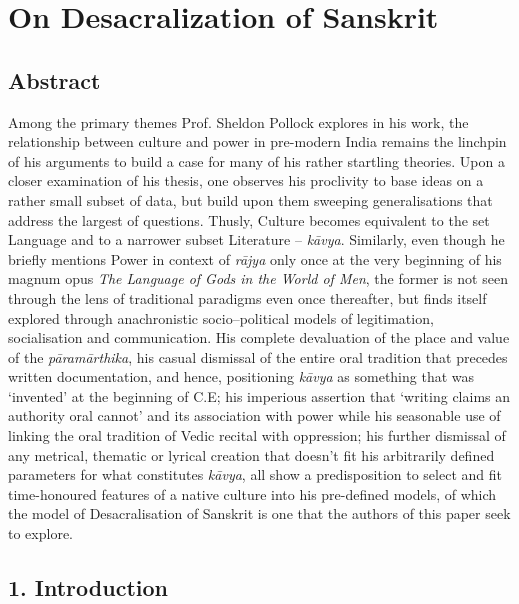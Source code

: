 
\chapter{On Desacralization of Sanskrit}\label{chapter8}



\section*{Abstract}

Among the primary themes Prof. Sheldon Pollock explores in his work, the relationship between culture and power in pre-modern India remains the linchpin of his arguments to build a case for many of his rather startling theories. Upon a closer examination of his thesis, one observes his proclivity to base ideas on a rather small subset of data, but build upon them sweeping generalisations that address the largest of questions. Thusly, Culture becomes equivalent to the set Language and to a narrower subset Literature – \textit{kāvya}. Similarly, even though he briefly mentions Power in context of \textit{rājya} only once at the very beginning of his magnum opus \textit{The Language of Gods in the World of Men}, the former is not seen through the lens of traditional paradigms even once thereafter, but finds itself explored through anachronistic socio–political models of legitimation, socialisation and communication. His complete devaluation of the place and value of the \textit{pāramārthika}, his casual dismissal of the entire oral tradition that precedes written documentation, and hence, positioning \textit{kāvya} as something that was ‘invented’ at the beginning of C.E; his imperious assertion that ‘writing claims an authority oral cannot’ and its association with power while his seasonable use of linking the oral tradition of Vedic recital with oppression; his further dismissal of any metrical, thematic or lyrical creation that doesn’t fit his arbitrarily defined parameters for what constitutes \textit{kāvya}, all show a predisposition to select and fit time-honoured features of a native culture into his pre-defined models, of which the model of Desacralisation of Sanskrit is one that the authors of this paper seek to explore.


\section*{1. Introduction}

